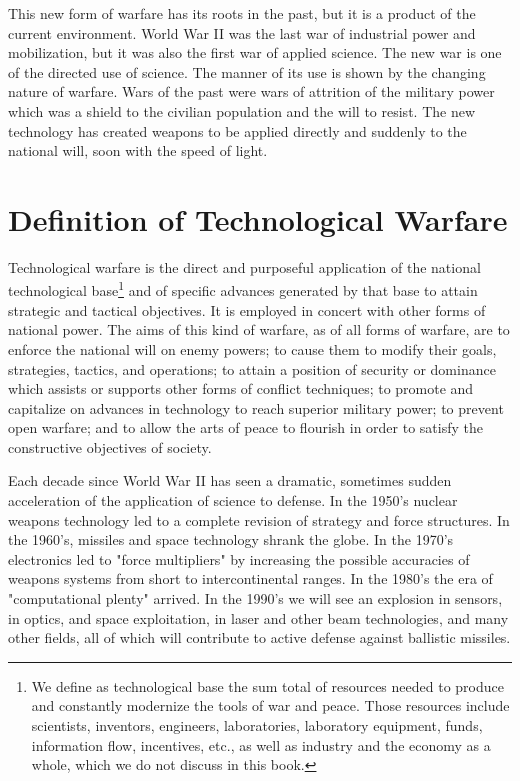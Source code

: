 This new form of warfare has its roots in the past, but it is a product of the current environment. World War II was the last war of industrial power and mobilization, but it was also the first war of applied science. The new war is one of the directed use of science. The manner of its use is shown by the changing nature of warfare. Wars of the past were wars of attrition of the military power which was a shield to the civilian population and the will to resist. The new technology has created weapons to be applied directly and suddenly to the national will, soon with the speed of light.

\section{Definition of Technological Warfare}
    
Technological warfare is the direct and purposeful application of the national technological base\footnote{We define as technological base the sum total of resources needed to produce and constantly modernize the tools of war and peace. Those resources include scientists, inventors, engineers, laboratories, laboratory equipment, funds, information flow, incentives, etc., as well as industry and the economy as a whole, which we do not discuss in this book.} and of specific advances generated by that base to attain strategic and tactical objectives. It is employed in concert with other forms of national power. The aims of this kind of warfare, as of all forms of warfare, are to enforce the national will on enemy powers; to cause them to modify their goals, strategies, tactics, and operations; to attain a position of security or dominance which assists or supports other forms of conflict techniques; to promote and capitalize on advances in technology to reach superior military power; to prevent open warfare; and to allow the arts of peace to flourish in order to satisfy the constructive objectives of society.

Each decade since World War II has seen a dramatic, sometimes sudden acceleration of the application of science to defense. In the 1950's nuclear weapons technology led to a complete revision of strategy and force structures. In the 1960's, missiles and space technology shrank the globe. In the 1970's electronics led to "force multipliers" by increasing the possible accuracies of weapons systems from short to intercontinental ranges. In the 1980's the era of "computational plenty" arrived. In the 1990's we will see an explosion in sensors, in optics, and space exploitation, in laser and other beam technologies, and many other fields, all of which will contribute to active defense against ballistic missiles.

